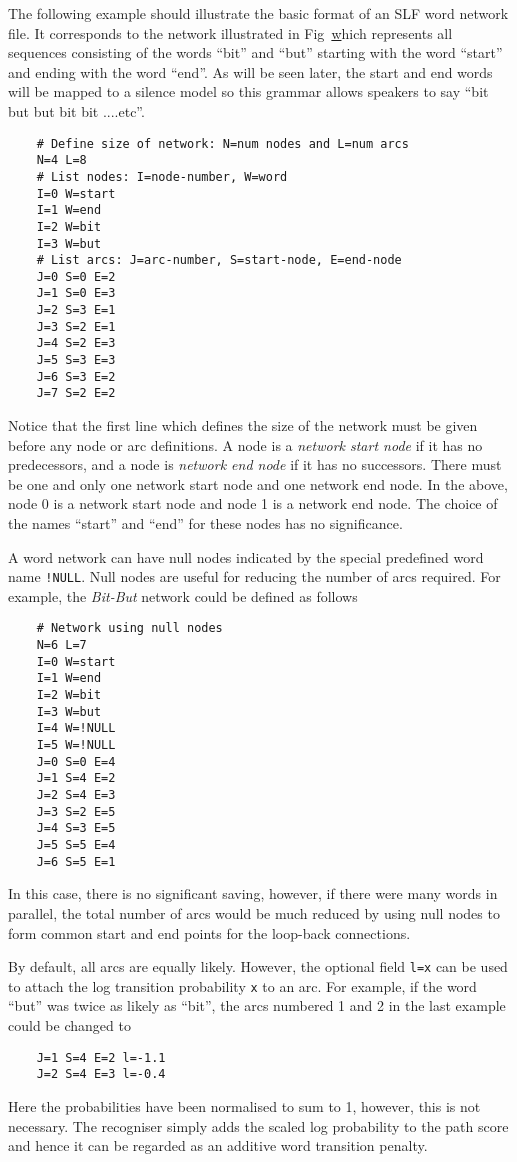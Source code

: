 The following example should illustrate the basic format 
of an SLF word network file.  It corresponds to the network
illustrated in Fig~\href{f:wdnet} which represents all sequences
consisting of the words ``bit'' and ``but'' starting with the
word ``start'' and ending with the word ``end''.  As will be
seen later, the start and end words will be mapped to a silence
model so this grammar allows speakers to 
say ``bit but but bit bit ....etc''.
\begin{verbatim}
    # Define size of network: N=num nodes and L=num arcs
    N=4 L=8
    # List nodes: I=node-number, W=word
    I=0 W=start
    I=1 W=end
    I=2 W=bit
    I=3 W=but
    # List arcs: J=arc-number, S=start-node, E=end-node
    J=0 S=0 E=2
    J=1 S=0 E=3
    J=2 S=3 E=1
    J=3 S=2 E=1
    J=4 S=2 E=3
    J=5 S=3 E=3
    J=6 S=3 E=2
    J=7 S=2 E=2
\end{verbatim}
Notice that the first line which defines the size of the network must be
given before any node or arc definitions.
A node is a \textit{network start node} if it has no predecessors,
and a node is \textit{network end node} if it has no successors.
There must be one and only one network start node and one network
end node.
In the above, node 0 is a network start node and node 1 is a
network end node.
The choice of the names ``start'' and ``end'' for these nodes
has no significance.


A word network can have null nodes indicated by the special
predefined word name \texttt{!NULL}.  Null nodes are useful for reducing
the number of arcs required.  For example, the \textit{Bit-But}
network could be defined as follows
\begin{verbatim}
    # Network using null nodes
    N=6 L=7
    I=0 W=start
    I=1 W=end
    I=2 W=bit
    I=3 W=but
    I=4 W=!NULL
    I=5 W=!NULL
    J=0 S=0 E=4
    J=1 S=4 E=2
    J=2 S=4 E=3
    J=3 S=2 E=5
    J=4 S=3 E=5
    J=5 S=5 E=4
    J=6 S=5 E=1
\end{verbatim}
In this case, there is no significant saving, however, if there
were many words in parallel, the total number of arcs would be
much reduced by using null nodes to form common start and end points for
the loop-back connections.

By default, all arcs are equally likely.  However, the optional
field \texttt{l=x} can be used to attach the log transition probability
\texttt{x} to an arc.  For example, if the word ``but'' was twice
as likely as ``bit'', the arcs numbered 1 and 2 in the last example
could be changed to
\begin{verbatim}
    J=1 S=4 E=2 l=-1.1
    J=2 S=4 E=3 l=-0.4
\end{verbatim}
Here the probabilities have been normalised to sum to 1, however,
this is not necessary.  The recogniser simply adds the scaled log probability
to the path score and hence it can be regarded as an additive
word transition penalty.

